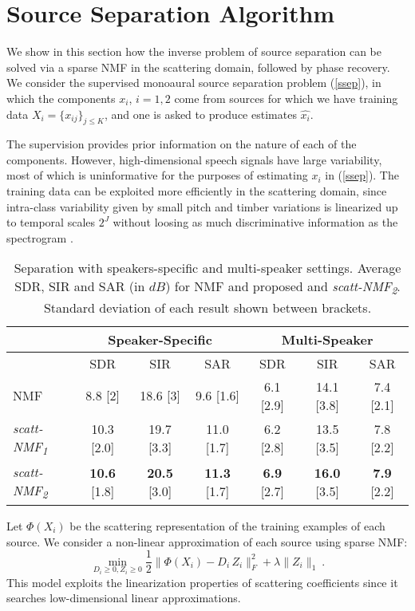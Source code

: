\section{Source Separation Algorithm}
\label{algosec}
We show in this section how the inverse problem of source separation 
can be solved via a sparse NMF in the scattering domain, followed by phase recovery.
We consider the supervised 
monoaural source separation problem (\ref{ssep}), 
 in which the components $x_i$, $i=1,2$ come from sources for 
 which we have training data $X_i=\{x_{ij}\}_{j \leq K}$, 
and one is asked to produce estimates $\widehat{x_i}$. 

The supervision provides  prior information on the nature of each of the 
components. However, high-dimensional speech signals have large variability, 
most of which is uninformative for the purposes of estimating $x_i$ in (\ref{ssep}).
The training data can be exploited more efficiently in the scattering domain, since 
intra-class variability given by small pitch and timber variations is linearized up to 
 temporal scales $2^J$ without loosing as much discriminative information as 
the spectrogram \cite{deepscatt,pami}.

\begin{table*}[t]
\centering
\begin{tabular}{l|c|c|c || c |c |c }
  \hline\hline
  & \multicolumn{3}{c||}{Speaker-Specific} & \multicolumn{3}{c}{Multi-Speaker} \\
  \hline
 & SDR & SIR & SAR & SDR & SIR & SAR\\
\hline
NMF  &8.8 [2] & 18.6 [3] &   9.6 [1.6] & 6.1 [2.9] &   14.1 [3.8] & 7.4 [2.1] \\
\hline
\emph{scatt-NMF\textsubscript{1}} & 10.3 [2.0]  & 19.7 [3.3]  & 11.0 [1.7] &  6.2 [2.8] &   13.5 [3.5] & 7.8 [2.2] \\
\emph{scatt-NMF\textsubscript{2}} &  {\bf 10.6} [1.8] & {\bf 20.5} [3.0]  & {\bf 11.3} [1.7]  &  {\bf 6.9} [2.7] & {\bf 16.0} [3.5]  & {\bf 7.9} [2.2] \\
  \hline
  \hline
\end{tabular}
\caption{Separation with speakers-specific and multi-speaker settings. Average SDR, SIR and SAR (in $dB$) for NMF and proposed  and \emph{scatt-NMF\textsubscript{2}}. Standard deviation of each result shown between brackets. \label{ta:eval}}
\vspace{-2ex}
\end{table*}


Let $\Phi(X_i)$ be the scattering representation of the training examples of each 
source. We consider a non-linear approximation of each source using sparse NMF:
\begin{equation}
\min_{D_i\geq 0, Z_i\geq 0} \frac{1}{2} \| \Phi(X_i) - D_i \, Z_i \|_F^2 + \lambda \| Z_i \|_1~.
\end{equation}
This model exploits the linearization properties of scattering coefficients since it 
searches low-dimensional linear approximations. 


